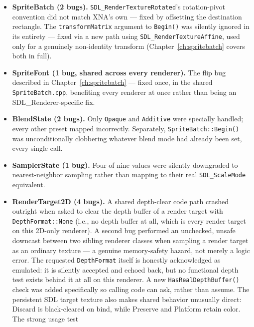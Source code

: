 \begin{itemize}
  \item \textbf{SpriteBatch (2 bugs).} \texttt{SDL\_RenderTextureRotated}'s rotation-pivot
        convention did not match XNA's own --- fixed by offsetting the destination
        rectangle. The \texttt{transformMatrix} argument to \texttt{Begin()} was silently
        ignored in its entirety --- fixed via a new path using
        \texttt{SDL\_RenderTextureAffine}, used only for a genuinely non-identity transform
        (Chapter~\ref{ch:spritebatch} covers both in full).
  \item \textbf{SpriteFont (1 bug, shared across every renderer).} The
         flip bug described in Chapter~\ref{ch:spritebatch} ---
        fixed once, in the shared \texttt{SpriteBatch.cpp}, benefiting every renderer at
        once rather than being an SDL\_Renderer-specific fix.
  \item \textbf{BlendState (2 bugs).} Only \texttt{Opaque} and \texttt{Additive} were
        specially handled; every other preset mapped incorrectly. Separately,
        \texttt{SpriteBatch::Begin()} was unconditionally clobbering whatever blend mode had
        already been set, every single call.
  \item \textbf{SamplerState (1 bug).} Four of nine  values were
        silently downgraded to nearest-neighbor sampling rather than mapping to their real
        \texttt{SDL\_ScaleMode} equivalent.
  \item \textbf{RenderTarget2D (4 bugs).} A shared depth-clear code path crashed outright
        when asked to clear the depth buffer of a render target with
        \texttt{DepthFormat::None} (i.e., no depth buffer at all, which is every render
        target on this 2D-only renderer). A second bug performed an unchecked, unsafe
        downcast between two sibling renderer classes when sampling a render target as an
        ordinary texture --- a genuine memory-safety hazard, not merely a logic error. The
        requested \texttt{DepthFormat} itself is honestly acknowledged as emulated: it is
        silently accepted and echoed back, but no functional depth test exists behind it at
        all on this renderer. A new \texttt{HasRealDepthBuffer()} check was added specifically
        so calling code can ask, rather than assume. The persistent SDL target texture also
        makes shared  behavior unusually direct: Discard is
        black-cleared on bind, while Preserve and Platform retain color. The strong usage test

\end{itemize}
